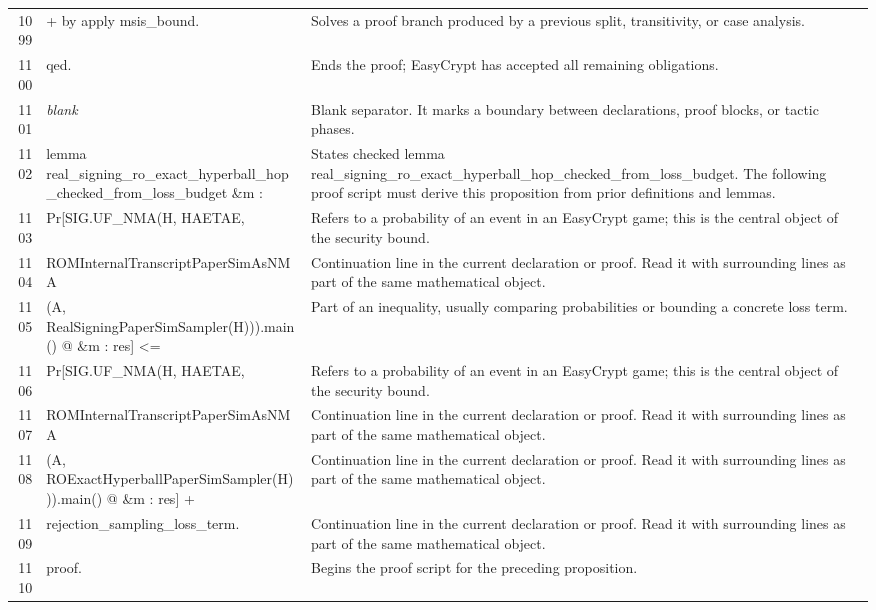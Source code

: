 \documentclass[10pt]{article}
\begin{document}
\begin{longtable}{r L{0.53\textwidth} L{0.37\textwidth}}
1099 & {\ttfamily\scriptsize + by apply msis\_bound.} & Solves a proof branch produced by a previous split, transitivity, or case analysis. \\
1100 & {\ttfamily\scriptsize qed.} & Ends the proof; EasyCrypt has accepted all remaining obligations. \\
1101 & {\ttfamily\scriptsize \emph{blank}} & Blank separator.  It marks a boundary between declarations, proof blocks, or tactic phases. \\
1102 & {\ttfamily\scriptsize lemma real\_signing\_ro\_exact\_hyperball\_hop\_checked\_from\_loss\_budget \&m :} & States checked lemma real\_signing\_ro\_exact\_hyperball\_hop\_checked\_from\_loss\_budget.  The following proof script must derive this proposition from prior definitions and lemmas. \\
1103 & {\ttfamily\scriptsize   Pr[SIG.UF\_NMA(H, HAETAE,} & Refers to a probability of an event in an EasyCrypt game; this is the central object of the security bound. \\
1104 & {\ttfamily\scriptsize        ROMInternalTranscriptPaperSimAsNMA} & Continuation line in the current declaration or proof.  Read it with surrounding lines as part of the same mathematical object. \\
1105 & {\ttfamily\scriptsize          (A, RealSigningPaperSimSampler(H))).main() @ \&m : res] <=} & Part of an inequality, usually comparing probabilities or bounding a concrete loss term. \\
1106 & {\ttfamily\scriptsize   Pr[SIG.UF\_NMA(H, HAETAE,} & Refers to a probability of an event in an EasyCrypt game; this is the central object of the security bound. \\
1107 & {\ttfamily\scriptsize        ROMInternalTranscriptPaperSimAsNMA} & Continuation line in the current declaration or proof.  Read it with surrounding lines as part of the same mathematical object. \\
1108 & {\ttfamily\scriptsize          (A, ROExactHyperballPaperSimSampler(H))).main() @ \&m : res] +} & Continuation line in the current declaration or proof.  Read it with surrounding lines as part of the same mathematical object. \\
1109 & {\ttfamily\scriptsize     rejection\_sampling\_loss\_term.} & Continuation line in the current declaration or proof.  Read it with surrounding lines as part of the same mathematical object. \\
1110 & {\ttfamily\scriptsize proof.} & Begins the proof script for the preceding proposition. \\

\end{longtable}
\end{document}
